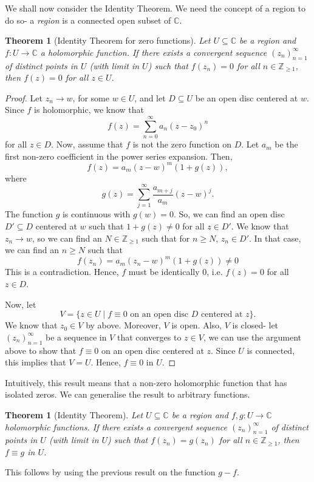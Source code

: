 \documentclass[a4paper, openany]{memoir}
\theoremstyle{definition}
\theoremstyle{plain}
\newtheorem{theorem}[definition]{Theorem}
\begin{document}
    We shall now consider the Identity Theorem. We need the concept of a region to do so- a \emph{region} is a connected open subset of $\mathbb{C}$.
    \begin{theorem}[Identity Theorem for zero functions]
        Let $U \subseteq \mathbb{C}$ be a region and $f \colon U \to \mathbb{C}$ a holomorphic function. If there exists a convergent sequence $(z_n)_{n=1}^\infty$ of distinct points in $U$ (with limit in $U$) such that $f(z_n) = 0$ for all $n \in \mathbb{Z}_{\geq 1}$, then $f(z) = 0$ for all $z \in U$.
    \end{theorem}
    \begin{proof}
        Let $z_n \to w$, for some $w \in U$, and let $D \subseteq U$ be an open disc centered at $w$. Since $f$ is holomorphic, we know that
        \[f(z) = \sum_{n=0}^\infty a_n (z - z_0)^n\]
        for all $z \in D$. Now, assume that $f$ is not the zero function on $D$. Let $a_m$ be the first non-zero coefficient in the power series expansion. Then,
        \[f(z) = a_m(z - w)^m(1 + g(z)),\]
        where 
        \[g(z) = \sum_{j=1}^\infty \frac{a_{m+j}}{a_m} (z - w)^j.\]
        The function $g$ is continuous with $g(w) = 0$. So, we can find an open disc $D' \subseteq D$ centered at $w$ such that $1 + g(z) \neq 0$ for all $z \in D'$. We know that $z_n \to w$, so we can find an $N \in \mathbb{Z}_{\geq 1}$ such that for $n \geq N$, $z_n \in D'$. In that case, we can find an $n \geq N$ such that
        \[f(z_n) = a_m (z_n - w)^m (1 + g(z)) \neq 0\]
        This is a contradiction. Hence, $f$ must be identically $0$, i.e. $f(z) = 0$ for all $z \in D$. 

        Now, let
        \[V = \{z \in U \mid f \equiv 0 \textrm{ on an open disc } D \textrm{ centered at } z\}.\]
        We know that $z_0 \in V$ by above. Moreover, $V$ is open. Also, $V$ is closed- let $(z_n)_{n=1}^\infty$ be a sequence in $V$ that converges to $z \in V$, we can use the argument above to show that $f \equiv 0$ on an open disc centered at $z$. Since $U$ is connected, this implies that $V = U$. Hence, $f \equiv 0$ in $U$.
    \end{proof}
    Intuitively, this result means that a non-zero holomorphic function that has isolated zeros. We can generalise the result to arbitrary functions.
    \begin{theorem}[Identity Theorem]
        Let $U \subseteq \mathbb{C}$ be a region and $f, g \colon U \to \mathbb{C}$ holomorphic functions. If there exists a convergent sequence $(z_n)_{n=1}^\infty$ of distinct points in $U$ (with limit in $U$) such that $f(z_n) = g(z_n)$ for all $n \in \mathbb{Z}_{\geq 1}$, then $f \equiv g$ in $U$.
    \end{theorem}
    \noindent This follows by using the previous result on the function $g - f$. 
\end{document}
